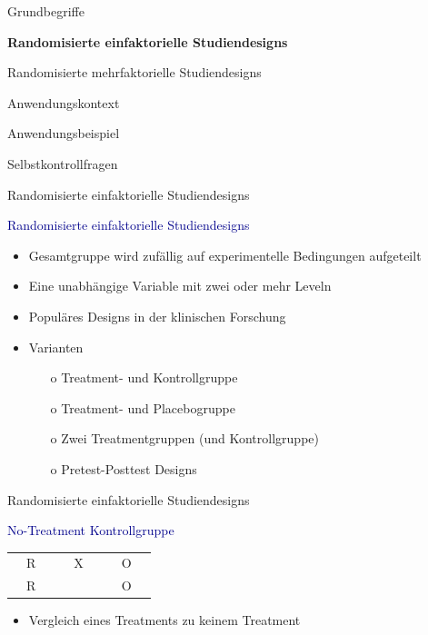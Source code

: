 \documentclass[
  8pt,
  ignorenonframetext,
]{beamer}
\providecommand{\tightlist}{%
  \setlength{\itemsep}{0pt}\setlength{\parskip}{0pt}}
\begin{document}
\begin{frame}[plain]{}
\protect\hypertarget{section-4}{}
\vfill
\large
{}

Grundbegriffe

\textbf{Randomisierte einfaktorielle Studiendesigns}

Randomisierte mehrfaktorielle Studiendesigns

Anwendungskontext

Anwendungsbeispiel

Selbstkontrollfragen \vfill
\end{frame}

\begin{frame}{Randomisierte einfaktorielle Studiendesigns}
\protect\hypertarget{randomisierte-einfaktorielle-studiendesigns}{}

\textcolor{darkblue}{Randomisierte einfaktorielle Studiendesigns}

\begin{itemize}
\tightlist
\item
  Gesamtgruppe wird zufällig auf experimentelle Bedingungen aufgeteilt
\item
  Eine unabhängige Variable mit zwei oder mehr Leveln
\item
  Populäres Designs in der klinischen Forschung
\item
  Varianten

  \begin{itemize}
  \item[o] Treatment- und Kontrollgruppe
  \item[o] Treatment- und Placebogruppe
  \item[o] Zwei Treatmentgruppen (und Kontrollgruppe)
  \item[o] Pretest-Posttest Designs
  \end{itemize}
\end{itemize}
\end{frame}

\begin{frame}{Randomisierte einfaktorielle Studiendesigns}
\protect\hypertarget{randomisierte-einfaktorielle-studiendesigns-1}{}
\large

\textcolor{darkblue}{No-Treatment Kontrollgruppe} \vspace{4mm}

\center
\begin{tabular}{|ccc|}
\hline
$\quad$R$\quad$  & $\quad$X$\quad$ & $\quad$O$\quad$
\\
$\quad$R$\quad$  & $\quad$ $\quad$ & $\quad$O$\quad$
\\\hline
\end{tabular}
\vspace{2mm}

\normalsize

\begin{itemize}
\tightlist
\item
  Vergleich eines Treatments zu keinem Treatment
\end{itemize}
\end{frame}
\end{document}
